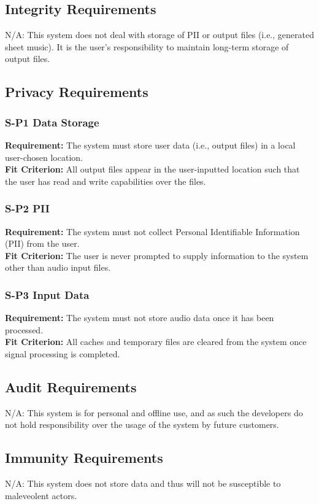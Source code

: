 \documentclass[12pt]{article}
\begin{document}
\subsection{Integrity Requirements}
N/A: This system does not deal with storage of PII or output files (i.e., generated sheet music). It is the user's responsibility to maintain long-term storage of output files.

\subsection{Privacy Requirements}
\subsubsection*{S-P1 Data Storage}
\textbf{Requirement:} The system must store user data (i.e., output files) in a local user-chosen location. \\ 
\textbf{Fit Criterion:} All output files appear in the user-inputted location such that the user has read and write capabilities over the files. 
\subsubsection*{S-P2 PII}
\textbf{Requirement:} The system must not collect Personal Identifiable Information (PII) from the user. \\ 
\textbf{Fit Criterion:} The user is never prompted to supply information to the system other than audio input files. 
\subsubsection*{S-P3 Input Data}
\textbf{Requirement:} The system must not store audio data once it has been processed. \\ 
\textbf{Fit Criterion:} All caches and temporary files are cleared from the system once signal processing is completed.

\subsection{Audit Requirements}
N/A: This system is for personal and offline use, and as such the developers do not hold responsibility over the usage of the system by future customers.
\subsection{Immunity Requirements}
N/A: This system does not store data and thus will not be susceptible to maleveolent actors.
\end{document}
